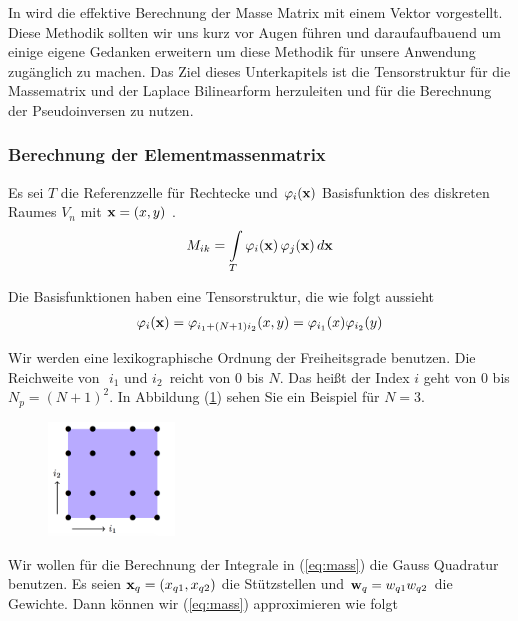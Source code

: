 In \cite{Teachlet} wird die effektive Berechnung der Masse Matrix mit einem Vektor vorgestellt. Diese Methodik sollten wir uns kurz vor Augen führen und daraufaufbauend um einige eigene Gedanken erweitern um diese Methodik für unsere Anwendung zugänglich zu machen.
Das Ziel dieses Unterkapitels ist die Tensorstruktur für die Massematrix und der Laplace Bilinearform herzuleiten und für die Berechnung der Pseudoinversen zu nutzen. 

\subsubsection{Berechnung der Elementmassenmatrix}
Es sei $T$ die Referenzzelle für Rechtecke und $\varphi_i(\bold{x})$ Basisfunktion des diskreten Raumes $V_n$ mit $\bold{x}=(x,y)$ .
\begin{equation} \label{eq:mass}
M_{ik} = \int\limits_{T} \varphi_i (\bold{x}) \, \varphi_j (\bold{x}) \, d\bold{x}
\end{equation}

Die Basisfunktionen haben eine Tensorstruktur, die wie folgt aussieht
\begin{equation} \label{eq:tensor}
\varphi_i(\bold{x})=\varphi_{i_1+(N+1)i_2}(x,y)=\varphi_{i_1}(x)\varphi_{i_2}(y)
\end{equation}

Wir werden eine lexikographische Ordnung der Freiheitsgrade benutzen. Die Reichweite von $\, \, i_1 $ und $ i_2 \, $ reicht von $0$ bis $N$. Das heißt der Index $i$ geht von $0$ bis $N_p=(N+1)^2$. In Abbildung (\ref{fig:lexi}) sehen Sie ein Beispiel für $N=3$.

\begin{figure}[ht] 
	\centering
  \includegraphics[width=0.3\textwidth]{lexi.png}
	\caption{ \cite[3]{Teachlet}}
	\label{fig:lexi}
\end{figure}

Wir wollen für die Berechnung der Integrale in (\ref{eq:mass}) die Gauss Quadratur benutzen.
Es seien $\bold{x}_q=(x_{q1},x_{q2})$ die Stützstellen und $\bold{w}_q=w_{q1}w_{q2}$ die Gewichte. Dann können wir (\ref{eq:mass}) approximieren wie folgt

